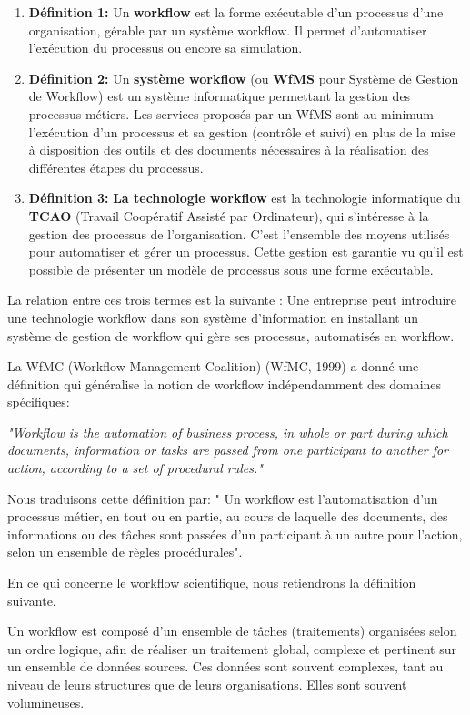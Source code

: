 \begin{enumerate}
	\item \textbf{Définition 1: }  Un\textbf{ workflow} est la forme exécutable d'un processus d'une organisation, gérable par un système workflow. Il permet d'automatiser l'exécution du processus ou encore sa simulation.
	
	\item \textbf{Définition 2: }Un \textbf{système workflow} (ou \textbf{WfMS} pour Système de Gestion de Workflow) est un système informatique permettant la gestion des processus métiers. Les services proposés par un WfMS sont au minimum l'exécution d'un processus et sa gestion (contrôle et suivi) en plus de la mise à disposition des outils et des documents nécessaires à la réalisation des différentes étapes du processus. 
	\item \textbf{Définition 3: }\textbf{La technologie workflow} est la technologie informatique du \textbf{TCAO} (Travail Coopératif Assisté par Ordinateur), qui s'intéresse à la gestion des processus de l'organisation. C'est l'ensemble des moyens utilisés pour automatiser et gérer un processus. Cette gestion est garantie vu qu'il est possible de présenter un modèle de processus sous une forme exécutable.
\end{enumerate}

La relation entre ces trois termes est la suivante : Une entreprise peut introduire une technologie workflow dans son système d'information en installant un système de gestion de workflow qui gère ses processus, automatisés en workflow.

La WfMC (Workflow Management Coalition) (WfMC, 1999) a donné une définition qui généralise la notion de workflow indépendamment des domaines spécifiques:

\textit{"Workflow is the automation of business process, in whole or part during which documents, information or tasks are passed from one participant to another for action, according to a set of procedural rules."}

Nous traduisons cette définition par: " Un workflow est l'automatisation d'un processus métier, en tout ou en partie, au cours de laquelle des documents, des informations ou des tâches sont passées d'un participant à un autre pour l'action, selon un ensemble de règles procédurales". 

En ce qui concerne le workflow scientifique, nous retiendrons la définition suivante. 

Un workflow est composé d’un ensemble de tâches (traitements) organisées selon un ordre logique, afin de réaliser un traitement global, complexe et pertinent sur un ensemble de données sources. Ces données sont souvent complexes, tant au niveau de leurs structures que de leurs organisations. Elles sont souvent volumineuses.

